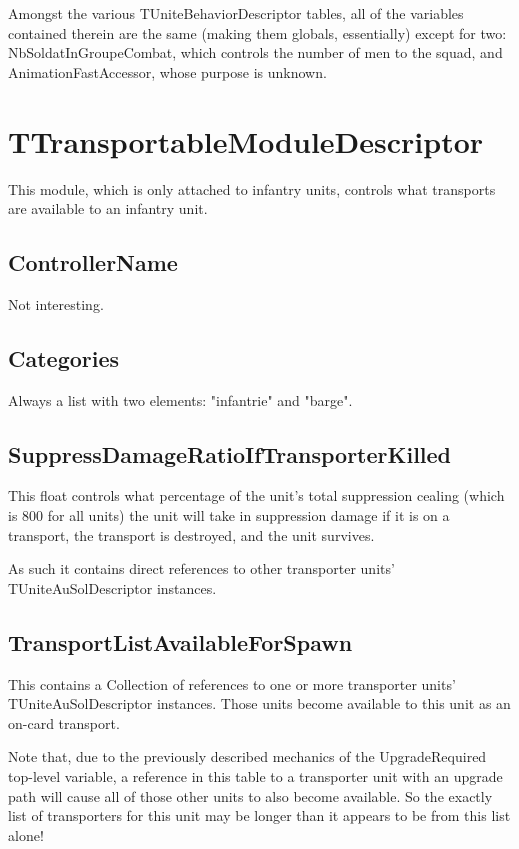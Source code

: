 \documentclass{article}
\begin{document}
Amongst the various TUniteBehaviorDescriptor tables, all of the variables contained therein are the same (making them globals, essentially) except for two: NbSoldatInGroupeCombat, which controls the number of men to the squad, and AnimationFastAccessor, whose purpose is unknown.

\section{TTransportableModuleDescriptor}

This module, which is only attached to infantry units, controls what transports are available to an infantry unit.

\subsection{ControllerName}

Not interesting.

\subsection{Categories}

Always a list with two elements: "infantrie" and "barge".

\subsection{SuppressDamageRatioIfTransporterKilled}

This float controls what percentage of the unit's total suppression cealing (which is 800 for all units) the unit will take in suppression damage if it is on a transport, the transport is destroyed, and the unit survives.

As such it contains direct references to other transporter units' TUniteAuSolDescriptor instances.

\subsection{TransportListAvailableForSpawn}

This contains a Collection of references to one or more transporter units' TUniteAuSolDescriptor instances. Those units become available to this unit as an on-card transport.

Note that, due to the previously described mechanics of the UpgradeRequired top-level variable, a reference in this table to a transporter unit with an upgrade path will cause all of those other units to also become available. So the exactly list of transporters for this unit may be longer than it appears to be from this list alone!
\end{document}
